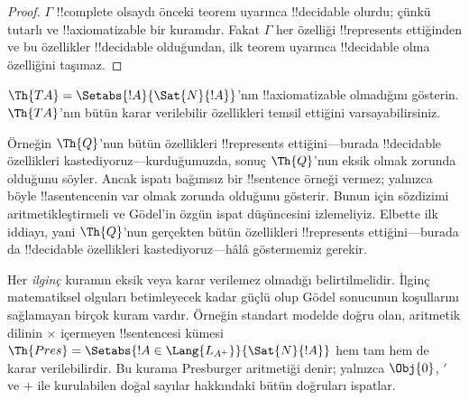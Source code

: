 \documentclass[../../../include/open-logic-section]{subfiles}
\begin{document}
\begin{proof}
$\Gamma$ !!{complete} olsaydı önceki teorem uyarınca !!{decidable} olurdu;
çünkü tutarlı ve !!{axiomatizable} bir kuramdır. Fakat $\Gamma$ her özelliği
!!{represents} ettiğinden ve bu özellikler !!{decidable} olduğundan, ilk
teorem uyarınca !!{decidable} olma özelliğini taşımaz.
\end{proof}

\begin{prob}
$\Th{TA} = \Setabs{!A}{\Sat{N}{!A}}$'nın !!{axiomatizable} olmadığını
gösterin. $\Th{TA}$'nın bütün karar verilebilir özellikleri temsil ettiğini
varsayabilirsiniz.
\end{prob}

Örneğin $\Th{Q}$'nun bütün özellikleri !!{represents} ettiğini---burada
!!{decidable} özellikleri kastediyoruz---kurduğumuzda, sonuç $\Th{Q}$'nun
eksik olmak zorunda olduğunu söyler. Ancak
ispatı bağımsız bir !!{sentence} örneği vermez; yalnızca böyle !!a{sentence}{}nin
var olmak zorunda olduğunu gösterir. Bunun için sözdizimi aritmetikleştirmeli
ve G\"odel'in özgün ispat düşüncesini izlemeliyiz. Elbette ilk iddiayı, yani
$\Th{Q}$'nun gerçekten bütün özellikleri !!{represents} ettiğini---burada da
!!{decidable} özellikleri kastediyoruz---hâlâ göstermemiz gerekir.

Her \emph{ilginç} kuramın eksik veya karar verilemez olmadığı belirtilmelidir.
İlginç matematiksel olguları betimleyecek kadar güçlü olup G\"odel sonucunun
koşullarını sağlamayan birçok kuram vardır. Örneğin standart modelde doğru
olan, aritmetik dilinin $\times$ içermeyen !!{sentence}s{}i kümesi
$\Th{Pres} = \Setabs{!A \in \Lang{L_{A^+}}}{\Sat{N}{!A}}$ hem tam hem de
karar verilebilirdir. Bu kurama Presburger aritmetiği denir; yalnızca
$\Obj{0}$, $\prime$ ve $+$ ile kurulabilen doğal sayılar hakkındaki bütün
doğruları ispatlar.
\end{document}

